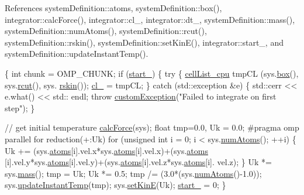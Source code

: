 References system\-Definition\-::atoms, system\-Definition\-::box(), integrator\-::calc\-Force(), integrator\-::cl\-\_\-, integrator\-::dt\-\_\-, system\-Definition\-::mass(), system\-Definition\-::num\-Atoms(), system\-Definition\-::rcut(), system\-Definition\-::rskin(), system\-Definition\-::set\-Kin\-E(), integrator\-::start\-\_\-, and system\-Definition\-::update\-Instant\-Temp().


\begin{DoxyCode}
                                     \{
    \textcolor{keywordtype}{int} chunk = OMP\_CHUNK;
    \textcolor{keywordflow}{if} (\hyperlink{classintegrator_a5b3546a765d8a83b6db8a6d890ace480}{start\_}) \{
        \textcolor{keywordflow}{try} \{
            \hyperlink{classcell_list__cpu}{cellList\_cpu} tmpCL (sys.\hyperlink{classsystem_definition_a85b80dee3609ddb68e370cee3fa959ea}{box}(), sys.\hyperlink{classsystem_definition_acacd88aac7d451bdcf9779ae8c5a95c7}{rcut}(), sys.
      \hyperlink{classsystem_definition_a343c8b17c052215a32412ec3df4f1d9a}{rskin}());
            \hyperlink{classintegrator_ad1f7813c9cf3c31898aa7d78fc22232a}{cl\_} = tmpCL;
        \} \textcolor{keywordflow}{catch} (std::exception &e) \{
            std::cerr << e.what() << std:: endl;
            \textcolor{keywordflow}{throw} \hyperlink{classcustom_exception}{customException}(\textcolor{stringliteral}{"Failed to integrate on first
       step"});
        \}

        \textcolor{comment}{// get initial temperature}
        \hyperlink{classintegrator_ad630bf7c9b7339fa34f36fe43b0d9e3c}{calcForce}(sys);
        \textcolor{keywordtype}{float} tmp=0.0, Uk = 0.0;
\textcolor{preprocessor}{        #pragma omp parallel for reduction(+:Uk)}
\textcolor{preprocessor}{}        \textcolor{keywordflow}{for} (\textcolor{keywordtype}{unsigned} \textcolor{keywordtype}{int} i = 0; i < sys.\hyperlink{classsystem_definition_ae8d3c2df2d56241cee03fcc4e2026ae0}{numAtoms}(); ++i) \{
            Uk += (sys.\hyperlink{classsystem_definition_ae8814d3f60fc1111af2a3f218a4bfcab}{atoms}[i].vel.x*sys.\hyperlink{classsystem_definition_ae8814d3f60fc1111af2a3f218a4bfcab}{atoms}[i].vel.x)+(sys.\hyperlink{classsystem_definition_ae8814d3f60fc1111af2a3f218a4bfcab}{atoms}
      [i].vel.y*sys.\hyperlink{classsystem_definition_ae8814d3f60fc1111af2a3f218a4bfcab}{atoms}[i].vel.y)+(sys.\hyperlink{classsystem_definition_ae8814d3f60fc1111af2a3f218a4bfcab}{atoms}[i].vel.z*sys.\hyperlink{classsystem_definition_ae8814d3f60fc1111af2a3f218a4bfcab}{atoms}[i].
      vel.z);
        \}
        Uk *= sys.\hyperlink{classsystem_definition_acb6dd3df121e3e5bc0eb41c32bd937bd}{mass}();
        tmp = Uk;
        Uk *= 0.5;
        tmp /= (3.0*(sys.\hyperlink{classsystem_definition_ae8d3c2df2d56241cee03fcc4e2026ae0}{numAtoms}()-1.0));
        sys.\hyperlink{classsystem_definition_a285e6cd1de35ed125eecb20f0f774ab3}{updateInstantTemp}(tmp);
        sys.\hyperlink{classsystem_definition_a2b2c236698886bd1d106be802b987b61}{setKinE}(Uk);
        \hyperlink{classintegrator_a5b3546a765d8a83b6db8a6d890ace480}{start\_} = 0;
    \}
    

\end{DoxyCode}
